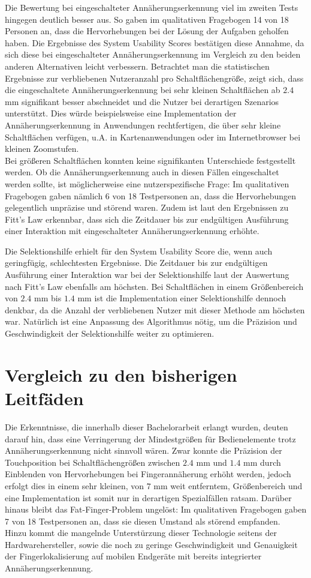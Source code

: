 \documentclass[12pt,bibliography=totocnumbered,listof=totocnumbered,abstracton]{scrreprt}
\begin{document}
Die Bewertung bei eingeschalteter Annäherungserkennung viel im zweiten Tests hingegen deutlich besser aus. So gaben im qualitativen Fragebogen 14 von 18 Personen an, dass die Hervorhebungen bei der Lösung der Aufgaben geholfen haben. Die Ergebnisse des System Usability Scores bestätigen diese Annahme, da sich diese bei eingeschalteter Annäherungserkennung im Vergleich zu den beiden anderen Alternativen leicht verbessern. Betrachtet man die statistischen Ergebnisse zur verbliebenen Nutzeranzahl pro Schaltflächengröße, zeigt sich, dass die eingeschaltete Annäherungserkennung bei sehr kleinen Schaltflächen ab $2.4$ mm signifikant besser abschneidet und die Nutzer bei derartigen Szenarios unterstützt. Dies würde beispielsweise eine Implementation der Annäherungserkennung in Anwendungen rechtfertigen, die über sehr kleine Schaltflächen verfügen, u.A. in Kartenanwendungen oder im Internetbrowser bei kleinen Zoomstufen.\\
Bei größeren Schaltflächen konnten keine signifikanten Unterschiede festgestellt werden. Ob die Annäherungserkennung auch in diesen Fällen eingeschaltet werden sollte, ist möglicherweise eine nutzerspezifische Frage: Im qualitativen Fragebogen gaben nämlich 6 von 18 Testpersonen an, dass die Hervorhebungen gelegentlich unpräzise und störend waren. Zudem ist laut den Ergebnissen zu Fitt's Law erkennbar, dass sich die Zeitdauer bis zur endgültigen Ausführung einer Interaktion mit eingeschalteter Annäherungserkennung erhöhte.

Die Selektionshilfe erhielt für den System Usability Score die, wenn auch geringfügig, schlechtesten Ergebnisse. Die Zeitdauer bis zur endgültigen Ausführung einer Interaktion war bei der Selektionshilfe laut der Auswertung nach Fitt's Law ebenfalls am höchsten. Bei Schaltflächen in einem Größenbereich von $2.4$ mm bis $1.4$ mm ist die Implementation einer Selektionshilfe dennoch denkbar, da die Anzahl der verbliebenen Nutzer mit dieser Methode am höchsten war. Natürlich ist eine Anpassung des Algorithmus nötig, um die Präzision und Geschwindigkeit der Selektionshilfe weiter zu optimieren.

\section{Vergleich zu den bisherigen Leitfäden}
Die Erkenntnisse, die innerhalb dieser Bachelorarbeit erlangt wurden, deuten darauf hin, dass eine Verringerung der Mindestgrößen für Bedienelemente trotz Annäherungserkennung nicht sinnvoll wären. Zwar konnte die Präzision der Touchposition bei Schaltflächengrößen zwischen $2.4$ mm und $1.4$ mm durch Einblenden von Hervorhebungen bei Fingerannäherung erhöht werden, jedoch erfolgt dies in einem sehr kleinen, von $7$ mm weit entferntem, Größenbereich und eine Implementation ist somit nur in derartigen Spezialfällen ratsam. Darüber hinaus bleibt das Fat-Finger-Problem ungelöst: Im qualitativen Fragebogen gaben 7 von 18 Testpersonen an, dass sie diesen Umstand als störend empfanden.\\
Hinzu kommt die mangelnde Unterstürzung dieser Technologie seitens der Hardwarehersteller, sowie die noch zu geringe Geschwindigkeit und Genauigkeit der Fingerlokalisierung auf mobilen Endgeräte mit bereits integrierter Annäherungserkennung.
\end{document}
